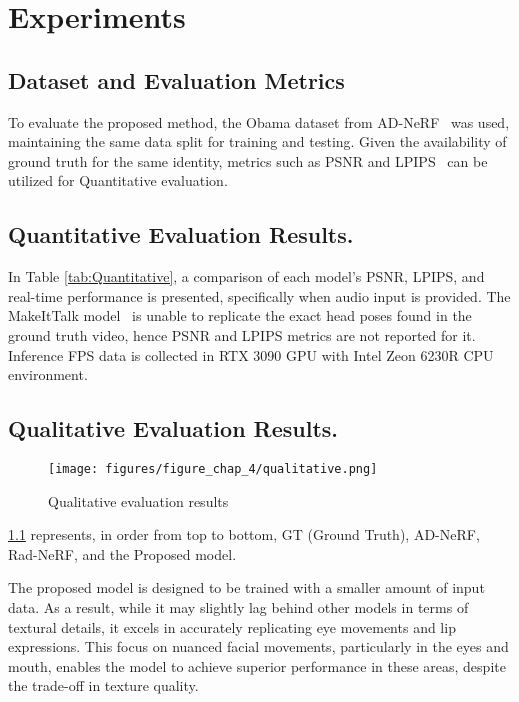 \chapter{Experiments}
\label{chap:Experiments}

\section{Dataset and Evaluation Metrics}
\label{sec:dataset_and_metrics}
To evaluate the proposed method, the Obama dataset from AD-NeRF~\cite{guo2021ad} was used, maintaining the same data split for training and testing.
Given the availability of ground truth for the same identity, metrics such as PSNR and LPIPS~\cite{zhang2018perceptual} can be utilized for Quantitative evaluation.


\section{Quantitative Evaluation Results. }
\label{sec:eval_Quantitative}
In Table \ref{tab:Quantitative}, a comparison of each model's PSNR, LPIPS, and real-time performance is presented, specifically when audio input is provided.
The MakeItTalk model~\cite{zhou2020makelttalk} is unable to replicate the exact head poses found in the ground truth video,
hence PSNR and LPIPS metrics are not reported for it.
Inference FPS data is collected in RTX 3090 GPU with Intel Zeon 6230R CPU environment.


\section{Qualitative Evaluation Results. }
\label{sec:eval_Qualitative}
\begin{figure}
    \centering
    \texttt{[image: figures/figure\_chap\_4/qualitative.png]}
    \caption{Qualitative evaluation results}
    \label{fig:qualitative}
\end{figure}

\ref{fig:qualitative} represents, in order from top to bottom, GT (Ground Truth), AD-NeRF, Rad-NeRF, and the Proposed model.

The proposed model is designed to be trained with a smaller amount of input data.
As a result, while it may slightly lag behind other models in terms of textural details, it excels in accurately replicating eye movements and lip expressions.
This focus on nuanced facial movements, particularly in the eyes and mouth, enables the model to achieve superior performance in these areas, despite the trade-off in texture quality.

